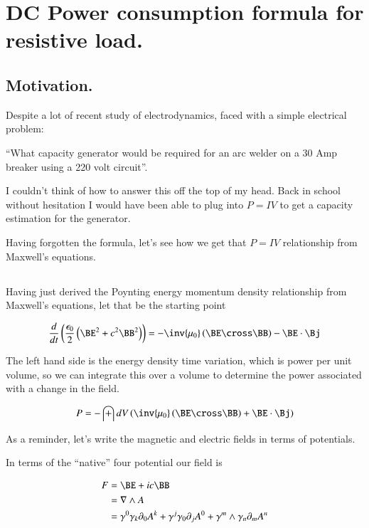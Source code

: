 \chapter{DC Power consumption formula for resistive load.}
\date{ Jan 06, 2009.  Last Revision: $Date: 2009/06/04 13:13:27 $ }

\section{Motivation. }

Despite a lot of recent study of electrodynamics, faced with a simple electrical problem:

``What capacity generator would be required for an arc welder on a 30 Amp breaker using a 220 volt circuit''.

I couldn't think of how to answer this off the top of my head.  Back in school without hesitation I would have
been able to plug into $P = I V$ to get a capacity estimation for the generator.

Having forgotten the formula, let's see how we get that $P = I V$ relationship from Maxwell's equations.

\section{}

Having just derived the Poynting energy momentum density relationship from Maxwell's equations, let that be the starting
point

\begin{align*}
\frac{d}{dt}\left(\frac{\epsilon_0}{2}\left(\BE^2 + c^2\BB^2 \right) \right) = - \inv{\mu_0} \left(\BE \cross \BB \right) - \BE \cdot \Bj
\end{align*}

The left hand side is the energy density time variation, which is power per unit volume, so we can integrate this
over a volume to determine the power associated with a change in the field.

\begin{align*}
P = -\int dV \left( \inv{\mu_0} \left(\BE \cross \BB \right) + \BE \cdot \Bj \right)
\end{align*}

As a reminder, let's write the magnetic and electric fields in terms of potentials.

In terms of the ``native'' four potential our field is

\begin{align*}
F 
&= \BE + ic \BB \\
&= \grad \wedge A \\
&= \gamma^0 \gamma_k \partial_0 A^k + \gamma^j \gamma_0 \partial_j A^0 + \gamma^m \wedge \gamma_n \partial_m A^n \\
\end{align*}

